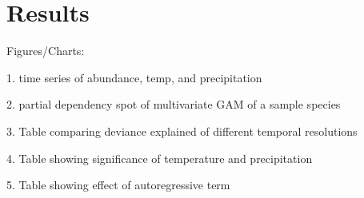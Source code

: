 \section{Results}

Figures/Charts: 

1. time series of abundance, temp, and precipitation

2. partial dependency spot of multivariate GAM of a sample species 

3. Table comparing deviance explained of different temporal resolutions

4. Table showing significance of temperature and precipitation

5. Table showing effect of autoregressive term